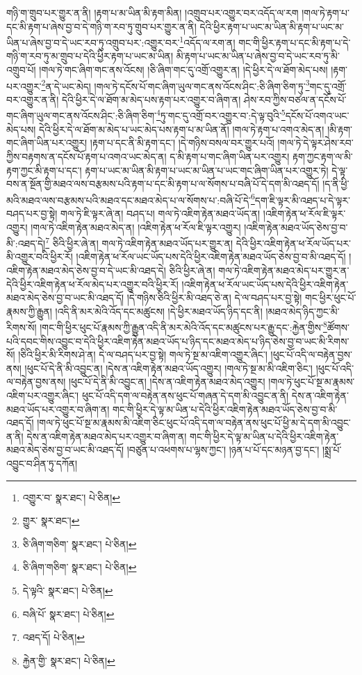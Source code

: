 གཉི་ག་གྲུབ་པར་གྱུར་ན་ནི། །རྟག་པ་མ་ཡིན་མི་རྟག་མིན། །འགྲུབ་པར་འགྱུར་བར་འདོད་ལ་རག །གལ་ཏེ་རྟག་པ་དང་མི་རྟག་པ་ཞེས་བྱ་བ་དེ་གཉི་ག་རབ་ཏུ་གྲུབ་པར་གྱུར་ན་ནི། དེའི་ཕྱིར་རྟག་པ་ཡང་མ་ཡིན་མི་རྟག་པ་ཡང་མ་ཡིན་པ་ཞེས་བྱ་བ་དེ་ཡང་རབ་ཏུ་འགྲུབ་པར་:འགྱུར་བར་\footnote{འགྱུར་བ་  སྣར་ཐང་།  པེ་ཅིན། }འདོད་ལ་རག་ན། གང་གི་ཕྱིར་རྟག་པ་དང་མི་རྟག་པ་དེ་གཉི་ག་རབ་ཏུ་མ་གྲུབ་པ་དེའི་ཕྱིར་རྟག་པ་ཡང་མ་ཡིན། མི་རྟག་པ་ཡང་མ་ཡིན་པ་ཞེས་བྱ་བ་དེ་ཡང་རབ་ཏུ་མི་འགྲུབ་པོ། །གལ་ཏེ་གང་ཞིག་གང་ནས་འོངས། །ཅི་ཞིག་གང་དུ་འགྲོ་འགྱུར་ན། །དེ་ཕྱིར་དེ་ལ་ཐོག་མེད་པས། །རྟག་པར་འགྱུར་\footnote{གྱུར་  སྣར་ཐང་། }ན་དེ་ཡང་མེད། །གལ་ཏེ་དངོས་པོ་གང་ཞིག་ཡུལ་གང་ནས་འོངས་ཤིང་:ཅི་ཞིག་ཅིག་ཏུ་\footnote{ཅི་ཞིག་གཅིག་  སྣར་ཐང་།  པེ་ཅིན། }གང་དུ་འགྲོ་བར་འགྱུར་ན་ནི། དེའི་ཕྱིར་དེ་ལ་ཐོག་མ་མེད་པས་རྟག་པར་འགྱུར་བ་ཞིག་ན། ཤེས་རབ་ཀྱིས་བཙལ་ན་དངོས་པོ་གང་ཞིག་ཡུལ་གང་ནས་འོངས་ཤིང་:ཅི་ཞིག་ཅིག་\footnote{ཅི་ཞིག་གཅིག་  སྣར་ཐང་།  པེ་ཅིན། }ཏུ་གང་དུ་འགྲོ་བར་འགྱུར་བ་:དེ་ལྟ་བུའི་\footnote{དེ་ལྟའི་  སྣར་ཐང་།  པེ་ཅིན། }དངོས་པོ་འགའ་ཡང་མེད་པས། དེའི་ཕྱིར་དེ་ལ་ཐོག་མ་མེད་པ་ཡང་མེད་པས་རྟག་པ་མ་ཡིན་ནོ། །གལ་ཏེ་རྟག་པ་འགའ་མེད་ན། །མི་རྟག་གང་ཞིག་ཡིན་པར་འགྱུར། །རྟག་པ་དང་ནི་མི་རྟག་དང་། །དེ་གཉིས་བསལ་བར་གྱུར་པའོ། །གལ་ཏེ་དེ་ལྟར་ཤེས་རབ་ཀྱིས་བརྟགས་ན་དངོས་པོ་རྟག་པ་འགའ་ཡང་མེད་ན། ད་མི་རྟག་པ་གང་ཞིག་ཡིན་པར་འགྱུར། རྟག་ཀྱང་རྟག་ལ་མི་རྟག་ཀྱང་མི་རྟག་པ་དང་། རྟག་པ་ཡང་མ་ཡིན་མི་རྟག་པ་ཡང་མ་ཡིན་པ་ཡང་གང་ཞིག་ཡིན་པར་འགྱུར་ཏེ། དེ་ལྟ་བས་ན་སྔོན་གྱི་མཐའ་ལས་བརྩམས་པའི་རྟག་པ་དང་མི་རྟག་པ་ལ་སོགས་པ་བཞི་པོ་དེ་དག་མི་འཐད་དོ། །ད་ནི་ཕྱི་མའི་མཐའ་ལས་བརྩམས་པའི་མཐའ་དང་མཐའ་མེད་པ་ལ་སོགས་པ་:བཞི་པོ་དེ་\footnote{བཞི་པོ་  སྣར་ཐང་།  པེ་ཅིན། }དག་ཇི་ལྟར་མི་འཐད་པ་དེ་ལྟར་བཤད་པར་བྱ་སྟེ། གལ་ཏེ་ཇི་ལྟར་ཞེ་ན། བཤད་པ། གལ་ཏེ་འཇིག་རྟེན་མཐའ་ཡོད་ན། །འཇིག་རྟེན་ཕ་རོལ་ཇི་ལྟར་འགྱུར། །གལ་ཏེ་འཇིག་རྟེན་མཐའ་མེད་ན། །འཇིག་རྟེན་ཕ་རོལ་ཇི་ལྟར་འགྱུར། །འཇིག་རྟེན་མཐའ་ཡོད་ཅེས་བྱ་བ་མི་:འཐད་དེ།\footnote{འཐད་དོ།  པེ་ཅིན། } ཅིའི་ཕྱིར་ཞེ་ན། གལ་ཏེ་འཇིག་རྟེན་མཐའ་ཡོད་པར་གྱུར་ན། དེའི་ཕྱིར་འཇིག་རྟེན་ཕ་རོལ་ཡོད་པར་མི་འགྱུར་བའི་ཕྱིར་རོ། །འཇིག་རྟེན་ཕ་རོལ་ཡང་ཡོད་པས་དེའི་ཕྱིར་འཇིག་རྟེན་མཐའ་ཡོད་ཅེས་བྱ་བ་མི་འཐད་དོ། །འཇིག་རྟེན་མཐའ་མེད་ཅེས་བྱ་བ་དེ་ཡང་མི་འཐད་དེ། ཅིའི་ཕྱིར་ཞེ་ན། གལ་ཏེ་འཇིག་རྟེན་མཐའ་མེད་པར་གྱུར་ན་དེའི་ཕྱིར་འཇིག་རྟེན་ཕ་རོལ་མེད་པར་འགྱུར་བའི་ཕྱིར་རོ། །འཇིག་རྟེན་ཕ་རོལ་ཡང་ཡོད་པས་དེའི་ཕྱིར་འཇིག་རྟེན་མཐའ་མེད་ཅེས་བྱ་བ་ཡང་མི་འཐད་དོ། །དེ་གཉིས་ཅིའི་ཕྱིར་མི་འཐད་ཅེ་ན། དེ་ལ་བཤད་པར་བྱ་སྟེ། གང་ཕྱིར་ཕུང་པོ་རྣམས་ཀྱི་རྒྱུན། །འདི་ནི་མར་མེའི་འོད་དང་མཚུངས། །དེ་ཕྱིར་མཐའ་ཡོད་ཉིད་དང་ནི། །མཐའ་མེད་ཉིད་ཀྱང་མི་རིགས་སོ། །གང་གི་ཕྱིར་ཕུང་པོ་རྣམས་ཀྱི་རྒྱུན་འདི་ནི་མར་མེའི་འོད་དང་མཚུངས་པར་རྒྱུ་དང་:རྐྱེན་གྱིས་\footnote{རྐྱེན་གྱི་  སྣར་ཐང་།  པེ་ཅིན། }ཚོགས་པའི་དབང་གིས་འབྱུང་བ་དེའི་ཕྱིར་འཇིག་རྟེན་མཐའ་ཡོད་པ་ཉིད་དང་མཐའ་མེད་པ་ཉིད་ཅེས་བྱ་བ་ཡང་མི་རིགས་སོ། །ཅིའི་ཕྱིར་མི་རིགས་ཤེ་ན། དེ་ལ་བཤད་པར་བྱ་སྟེ། གལ་ཏེ་སྔ་མ་འཇིག་འགྱུར་ཞིང་། །ཕུང་པོ་འདི་ལ་བརྟེན་བྱས་ནས། །ཕུང་པོ་དེ་ནི་མི་འབྱུང་ན། །དེས་ན་འཇིག་རྟེན་མཐའ་ཡོད་འགྱུར། །གལ་ཏེ་སྔ་མ་མི་འཇིག་ཅིང་། །ཕུང་པོ་འདི་ལ་བརྟེན་བྱས་ནས། །ཕུང་པོ་དེ་ནི་མི་འབྱུང་ན། །དེས་ན་འཇིག་རྟེན་མཐའ་མེད་འགྱུར། །གལ་ཏེ་ཕུང་པོ་སྔ་མ་རྣམས་འཇིག་པར་འགྱུར་ཞིང་། ཕུང་པོ་འདི་དག་ལ་བརྟེན་ནས་ཕུང་པོ་གཞན་དེ་དག་མི་འབྱུང་ན་ནི། དེས་ན་འཇིག་རྟེན་མཐའ་ཡོད་པར་འགྱུར་བ་ཞིག་ན། གང་གི་ཕྱིར་དེ་ལྟ་མ་ཡིན་པ་དེའི་ཕྱིར་འཇིག་རྟེན་མཐའ་ཡོད་ཅེས་བྱ་བ་མི་འཐད་དོ། །གལ་ཏེ་ཕུང་པོ་སྔ་མ་རྣམས་མི་འཇིག་ཅིང་ཕུང་པོ་འདི་དག་ལ་བརྟེན་ནས་ཕུང་པོ་ཕྱི་མ་དེ་དག་མི་འབྱུང་ན་ནི། དེས་ན་འཇིག་རྟེན་མཐའ་མེད་པར་འགྱུར་བ་ཞིག་ན། གང་གི་ཕྱིར་དེ་ལྟ་མ་ཡིན་པ་དེའི་ཕྱིར་འཇིག་རྟེན་མཐའ་མེད་ཅེས་བྱ་བ་ཡང་མི་འཐད་དོ། །བཙུན་པ་འཕགས་པ་ལྷས་ཀྱང་། །ཉན་པ་པོ་དང་མཉན་བྱ་དང་། །སྨྲ་པོ་འབྱུང་བ་ཤིན་ཏུ་དཀོན། 